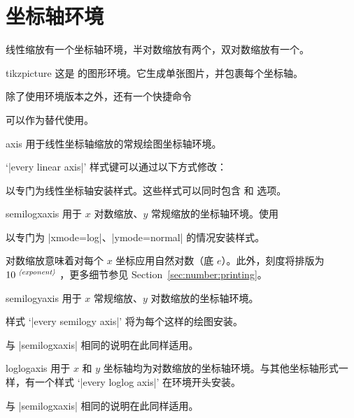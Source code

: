 
\section{坐标轴环境}

线性缩放有一个坐标轴环境，半对数缩放有两个，双对数缩放有一个。
%
\begin{environment}{{tikzpicture}}
    这是 \Tikz{} 的图形环境。它生成单张图片，并包裹每个坐标轴。

    除了使用环境版本之外，还有一个快捷命令

    \declareandlabel{\tikz}

    可以作为替代使用。
\end{environment}

\begin{environment}{{axis}}
    用于线性坐标轴缩放的常规绘图坐标轴环境。

    `|every linear axis|' 样式键可以通过以下方式修改：
\begin{codeexample}
\end{codeexample}
    以专门为线性坐标轴安装样式。这些样式可以同时包含 \Tikz{} 和 \PGFPlots{} 选项。
\end{environment}

\begin{environment}{{semilogxaxis}}
    用于 $x$ 对数缩放、$y$ 常规缩放的坐标轴环境。使用
\begin{codeexample}
\end{codeexample}
    以专门为 |xmode=log|、|ymode=normal| 的情况安装样式。

    对数缩放意味着对每个 $x$ 坐标应用自然对数（底 $e$）。此外，刻度将排版为 $10^{\text{\meta{exponent}}}$，更多细节参见 Section~\ref{sec:number:printing}。
\end{environment}

\begin{environment}{{semilogyaxis}}
    用于 $x$ 常规缩放、$y$ 对数缩放的坐标轴环境。

    样式 `|every semilogy axis|' 将为每个这样的绘图安装。

    与 |semilogxaxis| 相同的说明在此同样适用。
\end{environment}

\begin{environment}{{loglogaxis}}
    用于 $x$ 和 $y$ 坐标轴均为对数缩放的坐标轴环境。与其他坐标轴形式一样，有一个样式 `|every loglog axis|' 在环境开头安装。

    与 |semilogxaxis| 相同的说明在此同样适用。
\end{environment}


